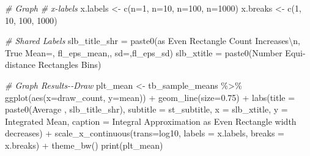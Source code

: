 \documentclass[
]{book}
\newenvironment{Shaded}{\begin{snugshade}}{\end{snugshade}}
\newcommand{\AttributeTok}[1]{\textcolor[rgb]{0.77,0.63,0.00}{#1}}
\newcommand{\CommentTok}[1]{\textcolor[rgb]{0.56,0.35,0.01}{\textit{#1}}}
\newcommand{\DecValTok}[1]{\textcolor[rgb]{0.00,0.00,0.81}{#1}}
\newcommand{\FloatTok}[1]{\textcolor[rgb]{0.00,0.00,0.81}{#1}}
\newcommand{\FunctionTok}[1]{\textcolor[rgb]{0.00,0.00,0.00}{#1}}
\newcommand{\NormalTok}[1]{#1}
\newcommand{\OtherTok}[1]{\textcolor[rgb]{0.56,0.35,0.01}{#1}}
\newcommand{\SpecialCharTok}[1]{\textcolor[rgb]{0.00,0.00,0.00}{#1}}
\newcommand{\StringTok}[1]{\textcolor[rgb]{0.31,0.60,0.02}{#1}}
\begin{document}
\begin{Shaded}
\begin{Highlighting}[]
\CommentTok{\# Graph}
\CommentTok{\# x{-}labels}
\NormalTok{x.labels }\OtherTok{\textless{}{-}} \FunctionTok{c}\NormalTok{(}\StringTok{\textquotesingle{}n=1\textquotesingle{}}\NormalTok{, }\StringTok{\textquotesingle{}n=10\textquotesingle{}}\NormalTok{, }\StringTok{\textquotesingle{}n=100\textquotesingle{}}\NormalTok{, }\StringTok{\textquotesingle{}n=1000\textquotesingle{}}\NormalTok{)}
\NormalTok{x.breaks }\OtherTok{\textless{}{-}} \FunctionTok{c}\NormalTok{(}\DecValTok{1}\NormalTok{, }\DecValTok{10}\NormalTok{, }\DecValTok{100}\NormalTok{, }\DecValTok{1000}\NormalTok{)}

\CommentTok{\# Shared Labels}
\NormalTok{slb\_title\_shr }\OtherTok{=} \FunctionTok{paste0}\NormalTok{(}\StringTok{\textquotesingle{}as Even Rectangle Count Increases}\SpecialCharTok{\textbackslash{}n}\StringTok{\textquotesingle{}}\NormalTok{,}
                       \StringTok{\textquotesingle{}True Mean=\textquotesingle{}}\NormalTok{, fl\_eps\_mean,}\StringTok{\textquotesingle{}, sd=\textquotesingle{}}\NormalTok{,fl\_eps\_sd)}
\NormalTok{slb\_xtitle }\OtherTok{=} \FunctionTok{paste0}\NormalTok{(}\StringTok{\textquotesingle{}Number Equi{-}distance Rectangles Bins\textquotesingle{}}\NormalTok{)}

\CommentTok{\# Graph Results{-}{-}Draw}
\NormalTok{plt\_mean }\OtherTok{\textless{}{-}}\NormalTok{ tb\_sample\_means }\SpecialCharTok{\%\textgreater{}\%}
  \FunctionTok{ggplot}\NormalTok{(}\FunctionTok{aes}\NormalTok{(}\AttributeTok{x=}\NormalTok{draw\_count, }\AttributeTok{y=}\NormalTok{mean)) }\SpecialCharTok{+}
  \FunctionTok{geom\_line}\NormalTok{(}\AttributeTok{size=}\FloatTok{0.75}\NormalTok{) }\SpecialCharTok{+}
  \FunctionTok{labs}\NormalTok{(}\AttributeTok{title =} \FunctionTok{paste0}\NormalTok{(}\StringTok{\textquotesingle{}Average \textquotesingle{}}\NormalTok{, slb\_title\_shr),}
       \AttributeTok{subtitle =}\NormalTok{ st\_subtitle,}
       \AttributeTok{x =}\NormalTok{ slb\_xtitle,}
       \AttributeTok{y =} \StringTok{\textquotesingle{}Integrated Mean\textquotesingle{}}\NormalTok{,}
       \AttributeTok{caption =} \StringTok{\textquotesingle{}Integral Approximation as Even Rectangle width decreases\textquotesingle{}}\NormalTok{) }\SpecialCharTok{+}
  \FunctionTok{scale\_x\_continuous}\NormalTok{(}\AttributeTok{trans=}\StringTok{\textquotesingle{}log10\textquotesingle{}}\NormalTok{, }\AttributeTok{labels =}\NormalTok{ x.labels, }\AttributeTok{breaks =}\NormalTok{ x.breaks) }\SpecialCharTok{+}
  \FunctionTok{theme\_bw}\NormalTok{()}
\FunctionTok{print}\NormalTok{(plt\_mean)}
\end{Highlighting}
\end{Shaded}
\end{document}
